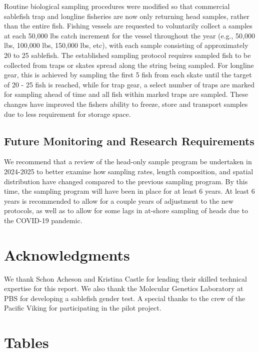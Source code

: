 \documentclass[12pt]{article}\usepackage[]{graphicx}\usepackage[]{color}
\begin{document}
Routine biological sampling procedures were modified so that commercial sablefish trap and longline fisheries are now only returning head samples, rather than the entire fish. Fishing vessels are requested to voluntarily collect a samples at each 50,000 lbs catch increment for the vessel throughout the year (e.g., 50,000 lbs, 100,000 lbs, 150,000 lbs, etc), with each sample consisting of approximately 20 to 25 sablefish. The established sampling protocol requires sampled fish to be collected from traps or skates spread along the string being sampled. For longline gear, this is achieved by sampling the first 5 fish from each skate until the target of 20 - 25 fish is reached, while for trap gear, a select number of traps are marked for sampling ahead of time and all fish within marked traps are sampled. These changes have improved the fishers ability to freeze, store and transport samples due to less requirement for storage space.

\hypertarget{future-monitoring-and-research-requirements}{%
\subsection{Future Monitoring and Research Requirements}\label{future-monitoring-and-research-requirements}}

We recommend that a review of the head-only sample program be undertaken in 2024-2025 to better examine how sampling rates, length composition, and spatial distribution have changed compared to the previous sampling program. By this time, the sampling program will have been in place for at least 6 years. At least 6 years is recommended to allow for a couple years of adjustment to the new protocols, as well as to allow for some lags in at-shore sampling of heads due to the COVID-19 pandemic.

\hypertarget{acknowledgments}{%
\section{Acknowledgments}\label{acknowledgments}}

We thank Schon Acheson and Kristina Castle for lending their skilled technical expertise for this report. We also thank the Molecular Genetics Laboratory at PBS for developing a sablefish gender test. A special thanks to the crew of the Pacific Viking for participating in the pilot project.

\clearpage

\hypertarget{tables}{%
\section{Tables}\label{tables}}
\end{document}
